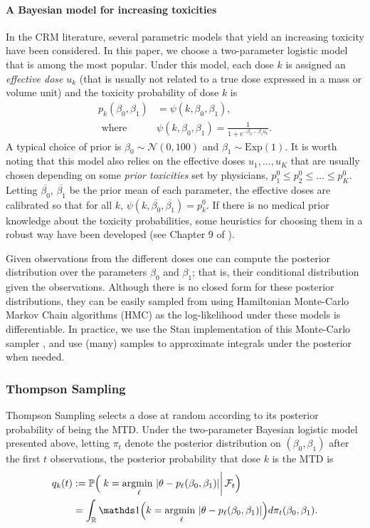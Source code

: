 \paragraph{A Bayesian model for increasing toxicities} In the CRM literature, several parametric models that yield an increasing toxicity have been considered. In this paper, we choose a two-parameter logistic model that is among the most popular. Under this model, each dose $k$ is assigned an \emph{effective dose} $u_k$ (that is usually not related to a true dose expressed in a mass or volume unit) and the toxicity probability of dose $k$ is
\begin{align*}
p_k(\beta_0,\beta_1) &= \psi(k,\beta_0,\beta_1),
\\
 \text{ where } \
&\psi(k,\beta_0,\beta_1) = \frac{1}{1 + e^{-\beta_0-\beta_1u_k}}.
\end{align*}
A typical choice of prior is $\beta_0 \sim \mathcal{N}(0,100)$ and $\beta_1 \sim \mathrm{Exp}(1)$. It is worth noting that this model also relies on the effective doses $u_1,\dots,u_K$ that are usually chosen depending on some \emph{prior toxicities} set by physicians, $p^0_1 \leq p^0_2 \leq \dots \leq p^0_K$. Letting $\overline{\beta_0}$, $\overline{\beta_1}$ be the prior mean of each parameter, the effective doses are calibrated so that for all $k$, $\psi(k,\overline{\beta_0},\overline{\beta_1}) = p_k^0$. If there is no medical prior knowledge about the toxicity probabilities, some heuristics for choosing them in a robust way have been developed (see Chapter 9 of \cite{CRMBook}).%
  
Given observations from the different doses one can compute the posterior distribution over the parameters $\beta_0$ and $\beta_1$; that is, their conditional distribution given the observations. Although there is no closed form for these posterior distributions, they can be easily sampled from using Hamiltonian Monte-Carlo Markov Chain algorithms (HMC) as the log-likelihood under these models is differentiable. In practice, we use the Stan implementation of this Monte-Carlo sampler \citep{StanManual}, and use (many) samples to approximate integrals under the posterior when needed.    
 
\subsubsection{Thompson Sampling}\label{sec:CRMvsTS}
Thompson Sampling selects a dose at random according to its posterior probability of being the MTD. Under the two-parameter Bayesian logistic model presented above, letting $\pi_t$ denote the posterior distribution on $(\beta_0,\beta_1)$ after the first $t$ observations, the posterior probability that dose $k$ is the MTD is
\begin{align*}
{q}_k(t) &: = \bP\Big(\left. k = \argminin{\ell} |\theta - p_\ell(\beta_0,\beta_1)| \right| \cF_t\Big)
\\
&= \int_{\R} \ind{\Big(k = \argminin{\ell} |\theta - p_\ell(\beta_0,\beta_1)|\Big)} d\pi_t(\beta_0,\beta_1).
\end{align*}

